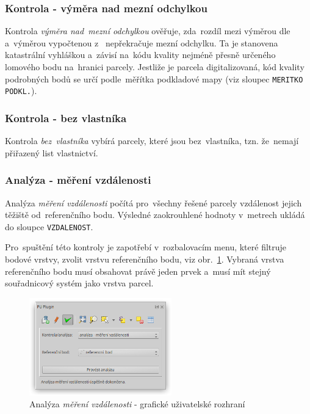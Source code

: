 \subsubsection{Kontrola - výměra nad mezní odchylkou}
\label{manual_kontrola_vymera}

Kontrola \textit{výměra nad~mezní odchylkou} ověřuje, zda~rozdíl mezi výměrou dle~ a~výměrou vypočtenou z~ nepřekračuje mezní odchylku. Ta je stanovena katastrální vyhláškou a~závisí na~kódu kvality nejméně přesně určeného lomového bodu na~hranici parcely. Jestliže je parcela digitalizovaná, kód kvality podrobných bodů se určí podle~měřítka podkladové mapy (viz sloupec \texttt{MERITKO PODKL.}).

\subsubsection{Kontrola - bez vlastníka}
\label{manual_kontrola_bez_vlastnika}

Kontrola \textit{bez~vlastníka} vybírá parcely, které jsou bez~vlastníka, tzn. že~nemají přiřazený list vlastnictví.

\subsubsection{Analýza - měření vzdálenosti}
\label{manual_analyza_vzdalenosti}

Analýza \textit{měření vzdálenosti} počítá pro~všechny řešené parcely vzdálenost jejich těžiště od~referenčního bodu. Výsledné zaokrouhlené hodnoty v~metrech ukládá do sloupce \texttt{VZDALENOST}.

Pro~spuštění této kontroly je zapotřebí v~rozbalovacím menu, které filtruje bodové vrstvy, zvolit vrstvu referenčního bodu, viz obr.~\ref{fig:manual_analyza_vzdalenosti_gui}. Vybraná vrstva referenčního bodu musí obsahovat právě jeden prvek a~musí mít stejný souřadnicový systém jako vrstva parcel.

	\begin{figure}[H]
		\centering
		\includegraphics[width=0.55\textwidth]{./pictures/analyza_vzdalenost.png}
		\caption[Analýza \textit{měření vzdálenosti} - grafické uživatelské rozhraní]{Analýza \textit{měření vzdálenosti} - grafické uživatelské rozhraní}
		\label{fig:manual_analyza_vzdalenosti_gui}
 	\end{figure}

